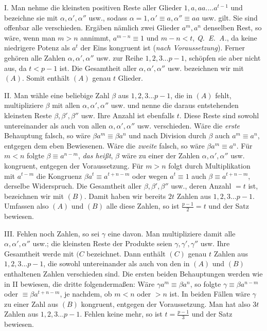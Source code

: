 I. Man nehme die kleinsten positiven Reste aller Glieder $1,a,aa....a^{t-1}$ und bezeichne sie mit $\alpha,\alpha',\alpha''$ usw., sodass $\alpha=1,\alpha'\equiv a,\alpha''\equiv aa$ usw. gilt. Sie sind offenbar alle verschieden. Ergäben nämlich zwei Glieder $a^m,a^n$ denselben Rest, so wäre, wenn man $m>n$ annimmt, $a^{m-n}\equiv1$ und $m-n<t$, \mbox{\emph{Q. E. A.}}, da keine niedrigere Potenz als $a^t$ der Eins kongruent ist (\emph{nach Voraussetzung}). Ferner gehören alle Zahlen $\alpha,\alpha',\alpha''$ usw. zur Reihe $1,2,3...p-1$, schöpfen sie aber nicht aus, da $t<p-1$ ist. Die Gesamtheit aller $\alpha,\alpha',\alpha''$ usw. bezeichnen wir mit $(A)$. Somit enthält $(A)$ genau $t$ Glieder.

II. Man wähle eine beliebige Zahl $\beta$ aus $1,2,3...p-1$, die in $(A)$ fehlt, multipliziere $\beta$ mit allen $\alpha,\alpha',\alpha''$ usw. und nenne die daraus entstehenden kleinsten Reste $\beta,\beta',\beta''$ usw. Ihre Anzahl ist ebenfalls $t$. Diese Reste sind sowohl untereinander als auch von allen $\alpha,\alpha',\alpha''$ usw. verschieden. Wäre die \emph{erste} Behauptung falsch, so wäre $\beta a^m\equiv\beta a^n$ und nach Division durch $\beta$ auch $a^m\equiv a^n$, entgegen dem eben Bewiesenen. Wäre die \emph{zweite} falsch, so wäre $\beta a^m\equiv a^n$. Für $m<n$ folgte $\beta\equiv a^{n-m}$, \emph{das heißt}, $\beta$ wäre zu einer der Zahlen $\alpha,\alpha',\alpha''$ usw. kongruent, entgegen der Voraussetzung. Für $m>n$ folgt durch Multiplikation mit $a^{t-m}$ die Kongruenz $\beta a^t\equiv a^{t+n-m}$ oder wegen $a^t\equiv1$ auch $\beta\equiv a^{t+n-m}$, derselbe Widerspruch. Die Gesamtheit aller $\beta,\beta',\beta''$ usw., deren Anzahl $=t$ ist, bezeichnen wir mit $(B)$. Damit haben wir bereits $2t$ Zahlen aus $1,2,3...p-1$. Umfassen also $(A)$ und $(B)$ alle diese Zahlen, so ist $\frac{p-1}{2}=t$ und der Satz bewiesen.

III. Fehlen noch Zahlen, so sei $\gamma$ eine davon. Man multipliziere damit alle $\alpha,\alpha',\alpha''$ usw.; die kleinsten Reste der Produkte seien $\gamma,\gamma',\gamma''$ usw. Ihre Gesamtheit werde mit $(C$ bezeichnet. Dann enthält $(C)$ genau $t$ Zahlen aus $1,2,3...p-1$, die sowohl untereinander als auch von den in $(A)$ und $(B)$
enthaltenen Zahlen verschieden sind. Die ersten beiden Behauptungen werden wie in II bewiesen, die dritte folgendermaßen: Wäre $\gamma a^m\equiv\beta a^n$, so folgte $\gamma\equiv\beta a^{n-m}$ oder $\equiv\beta a^{t+n-m}$, je nachdem, ob $m<n$ oder $>n$ ist. In beiden Fällen wäre $\gamma$ zu einer Zahl aus $(B)$ kongruent, entgegen der Voraussetzung. Man hat also $3t$ Zahlen aus $1,2,3...p-1$. Fehlen keine mehr, so ist $t=\frac{p-1}{3}$ und der Satz bewiesen.


